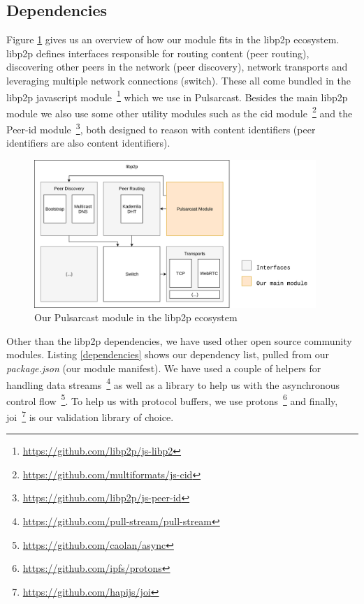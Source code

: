 \subsection{Dependencies}\label{subsec:dependencies}

Figure \ref{fig:pulsarcast-in-libp2p} gives us an overview of how our module
fits in the libp2p ecosystem. libp2p defines interfaces responsible for routing
content (peer routing), discovering other peers in the network (peer
discovery), network transports and leveraging multiple network connections
(switch). These all come bundled in the libp2p javascript
module~\footnote{\url{https://github.com/libp2p/js-libp2}} which we use in
Pulsarcast. Besides the main libp2p module we also use some other utility
modules such as the \acrshort{cid}
module~\footnote{\url{https://github.com/multiformats/js-cid}} and the Peer-id
module~\footnote{\url{https://github.com/libp2p/js-peer-id}}, both designed to reason
with content identifiers (peer identifiers are also content identifiers). 

\begin{figure}[hb!]
  \centering
  \includegraphics[width=0.95\textwidth]{img/pulsarcast-in-libp2p.png}
  \caption{Our Pulsarcast module in the libp2p ecosystem}
  \label{fig:pulsarcast-in-libp2p}
\end{figure}

Other than the libp2p dependencies, we have used other open source community
modules. Listing \ref{dependencies} shows our dependency list, pulled from our \emph{package.json} (our module manifest). We have used a couple of helpers
for handling data streams~\footnote{\url{https://github.com/pull-stream/pull-stream}}
as well as a library to help us with the asynchronous control
flow~\footnote{\url{https://github.com/caolan/async}}. To help us with protocol
buffers, we use protons~\footnote{\url{https://github.com/ipfs/protons}} and finally,
joi~\footnote{\url{https://github.com/hapijs/joi}} is our validation library of
choice.

